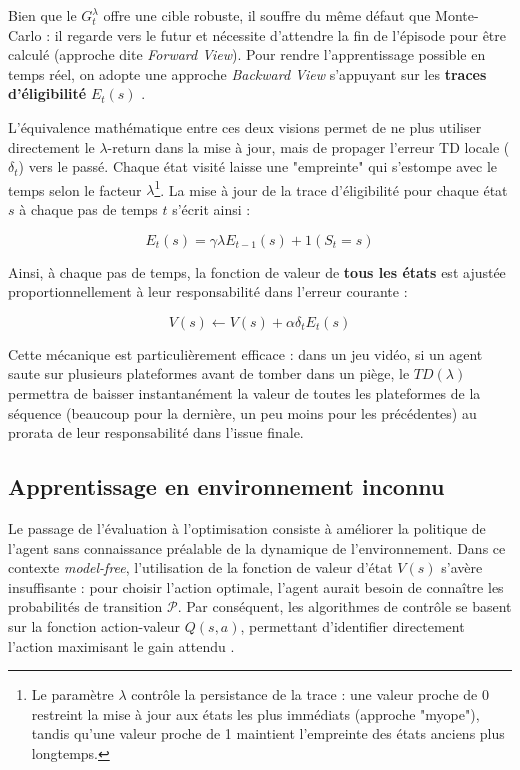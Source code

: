 Bien que le $G_t^\lambda$ offre une cible robuste, il souffre du même défaut que Monte-Carlo : il regarde vers le futur et nécessite d'attendre la fin de l'épisode pour être calculé (approche dite \textit{Forward View}). Pour rendre l'apprentissage possible en temps réel, on adopte une approche \textit{Backward View} s'appuyant sur les \textbf{traces d'éligibilité} $E_t(s)$ \parencite{silverLecturesReinforcementLearning2015}.

L'équivalence mathématique entre ces deux visions permet de ne plus utiliser directement le $\lambda$-return dans la mise à jour, mais de propager l'erreur TD locale ($\delta_t$) vers le passé. Chaque état visité laisse une "empreinte" qui s'estompe avec le temps selon le facteur $\lambda$\footnote{Le paramètre $\lambda$ contrôle la persistance de la trace : une valeur proche de 0 restreint la mise à jour aux états les plus immédiats (approche "myope"), tandis qu'une valeur proche de 1 maintient l'empreinte des états anciens plus longtemps.}. La mise à jour de la trace d'éligibilité pour chaque état $s$ à chaque pas de temps $t$ s'écrit ainsi :

\begin{equation}
    E_t(s) = \gamma\lambda E_{t-1}(s) + 1(S_t = s)
\end{equation}

Ainsi, à chaque pas de temps, la fonction de valeur de \textbf{tous les états} est ajustée proportionnellement à leur responsabilité dans l'erreur courante :

\begin{equation}
    V(s) \leftarrow V(s) + \alpha \delta_t E_t(s)
\end{equation}

Cette mécanique est particulièrement efficace : dans un jeu vidéo, si un agent saute sur plusieurs plateformes avant de tomber dans un piège, le $TD(\lambda)$ permettra de baisser instantanément la valeur de toutes les plateformes de la séquence (beaucoup pour la dernière, un peu moins pour les précédentes) au prorata de leur responsabilité dans l'issue finale.

\subsection{Apprentissage en environnement inconnu}

Le passage de l'évaluation à l'optimisation consiste à améliorer la politique de l'agent sans connaissance préalable de la dynamique de l'environnement. Dans ce contexte \textit{model-free}, l'utilisation de la fonction de valeur d'état $V(s)$ s'avère insuffisante : pour choisir l'action optimale, l'agent aurait besoin de connaître les probabilités de transition $\mathcal{P}$. Par conséquent, les algorithmes de contrôle se basent sur la fonction action-valeur $Q(s,a)$, permettant d'identifier directement l'action maximisant le gain attendu \parencite{silverLecturesReinforcementLearning2015}.

